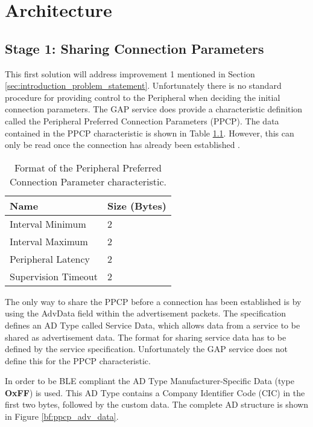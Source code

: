 \chapter{Architecture}
\label{chp:chapter_3}

\section{Stage 1: Sharing Connection Parameters}
\label{sec:ch_3_sharing_params}
This first solution will address improvement 1 mentioned in Section \ref{sec:introduction_problem_statement}. Unfortunately there is no standard procedure for providing control to the Peripheral when deciding the initial connection parameters. The GAP service does provide a characteristic definition called the Peripheral Preferred Connection Parameters (PPCP). The data contained in the PPCP characteristic is shown in Table \ref{tbl:ppcp_format}. However, this can only be read once the connection has already been established \cite[p.~1361]{bluetooth_spec}. 

\begin{table}
    \begin{center}
    \begin{tabular}{|l|l|}
        \hline
        \textbf{Name} & \textbf{Size (Bytes)} \\
        \hline
        Interval Minimum & 2 \\
        \hline
        Interval Maximum & 2 \\
        \hline
        Peripheral Latency & 2 \\
        \hline
        Supervision Timeout & 2 \\
        \hline
    \end{tabular}
    \end{center}
    \caption{Format of the Peripheral Preferred Connection Parameter characteristic.}
    \label{tbl:ppcp_format}
\end{table}

The only way to share the PPCP before a connection has been established is by using the AdvData field within the advertisement packets. The specification defines an AD Type called Service Data, which allows data from a service to be shared as advertisement data. The format for sharing service data has to be defined by the service specification. Unfortunately the GAP service does not define this for the PPCP characteristic.

In order to be BLE compliant the AD Type Manufacturer-Specific Data (type \textbf{OxFF}) is used. This AD Type contains a Company Identifier Code (CIC) in the first two bytes, followed by the custom data. The complete AD structure is shown in Figure \ref{bf:ppcp_adv_data}.

